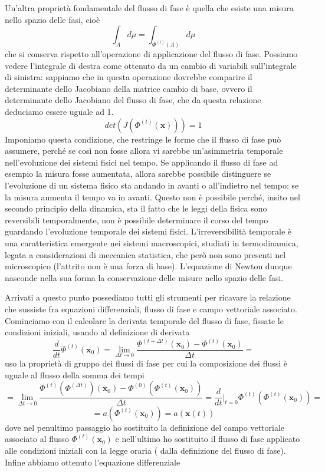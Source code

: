 \documentclass[
10pt, %
a4paper, %
oneside, %
headinclude,footinclude, %
BCOR5mm, %
]{scrartcl}
\begin{document}
\begin{teorema}
Un'altra proprietà fondamentale del flusso di fase è quella che esiste una misura nello spazio delle fasi, cioè
	\[\int_Ad\mu = \int_{\Phi^{(t)}(A)}d\mu\]
che si conserva rispetto all'operazione di applicazione del flusso di fase.
Possiamo vedere l'integrale di destra come ottenuto da un cambio di variabili sull'integrale di sinistra: sappiamo che in questa operazione dovrebbe comparire il determinante dello Jacobiano della matrice cambio di base, ovvero il determinante dello Jacobiano del flusso di fase, che da questa relazione deduciamo essere uguale ad 1. 
\[det(J(\Phi^{(t)}(\mathbf{x}))) = 1\]
Imponiamo questa condizione, che restringe le forme che il flusso di fase può assumere, perché se così non fosse allora vi sarebbe un'asimmetria temporale nell'evoluzione dei sistemi fisici nel tempo. Se applicando il flusso di fase ad esempio la misura fosse aumentata, allora sarebbe possibile distinguere se l'evoluzione di un sistema fisico sta andando in avanti o all'indietro nel tempo: se la misura aumenta il tempo va in avanti. Questo non è possibile perché, insito nel secondo principio della dinamica, sta il fatto che le leggi della fisica sono reversibili temporalmente, non è possibile determinare il corso del tempo guardando l'evoluzione temporale dei sistemi fisici. L'irreversibilità temporale è una caratteristica emergente nei sistemi macroscopici, studiati in termodinamica, legata a considerazioni di meccanica statistica, che però non sono presenti nel microscopico (l'attrito non è una forza di base). L'equazione di Newton dunque nasconde nella sua forma la conservazione delle misure nello spazio delle fasi. 
\end{teorema}
Arrivati a questo punto possediamo tutti gli strumenti per ricavare la relazione che sussiste fra equazioni differenziali, flusso di fase e campo vettoriale associato. Cominciamo con il calcolare la derivata temporale del flusso di fase, fissate le condizioni iniziali, usando al definizione di derivata
\[\frac{d}{dt}\Phi^{(t)}(\mathbf{x}_0) = \lim_{\Delta t\to0} \frac{\Phi^{(t+\Delta t)}(\mathbf{x}_0)-\Phi^{(t)}(\mathbf{x}_0)}{\Delta t} = \]
uso la proprietà di gruppo dei flussi di fase per cui la composizione dei flussi è uguale al flusso della somma dei tempi
\[=\lim_{\Delta t\to0} \frac{\Phi^{(t)}(\Phi^{(\Delta t)})(\mathbf{x}_0)- \Phi^{(0)}(\Phi^{(t)}(\mathbf{x}_0))}{\Delta t} = \frac{d}{dt}|_{t = 0} \Phi^{(t)}(\Phi^{(t)}(\mathbf{x}_0))=\]
\[= a(\Phi^{(t)}(\mathbf{x}_0)) = a(\mathbf{x}(t))\]
dove nel penultimo passaggio ho sostituito la definizione del campo vettoriale associato al flusso $\Phi^(t)(\mathbf{x}_0)$ e nell'ultimo ho sostituito il flusso di fase applicato alle condizioni iniziali con la legge oraria ( dalla definizione del flusso di fase). Infine abbiamo ottenuto l'equazione differenziale 
\end{document}
